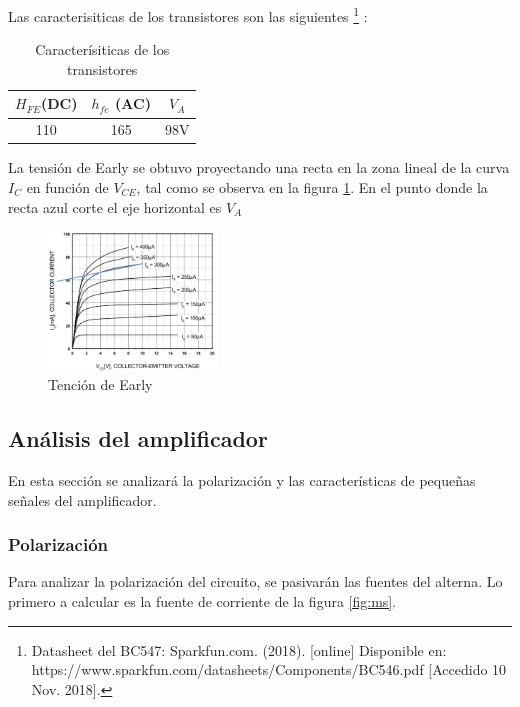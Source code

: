 \documentclass[../../main.tex]{subfiles}
\begin{document}
Las caracterisiticas de los transistores son las siguientes \footnote{Datasheet del BC547: Sparkfun.com. (2018). [online] Disponible en: https://www.sparkfun.com/datasheets/Components/BC546.pdf [Accedido 10 Nov. 2018].} :

\begin{table}[h]
\begin{center}
\begin{tabular}{|c|c|c|}
\hline
$H_{FE}$(DC)& $h_{fe}$ (AC)&$V_A$\\
\hline \hline
110&165 &$98\mathrm{V}$\\ \hline

\end{tabular}
\caption{Caracter\'isiticas de los transistores} \label{tab:qcar}
\end{center}
\end{table}

La tensión de Early se obtuvo proyectando una recta en la zona lineal de la curva $I_C$ en función de $V_{CE}$, tal como se observa en la figura \ref{fig:vea}. En el punto donde la recta azul corte el eje horizontal es $V_A$

\begin{figure}[H]	
	\centering
	\includegraphics[width=0.4\textwidth]{imagenes/vea.png}
	\caption{Tención de Early}\label{fig:vea}
\end{figure}


\subsection{Análisis del amplificador}
En esta sección se analizar\'a la polarización y las características de pequeñas señales del amplificador.
\subsubsection{Polarización}
Para analizar la polarización del circuito, se pasivar\'an las fuentes del alterna. Lo primero a calcular es la fuente de corriente de la figura \ref{fig:ms}.
\end{document}
